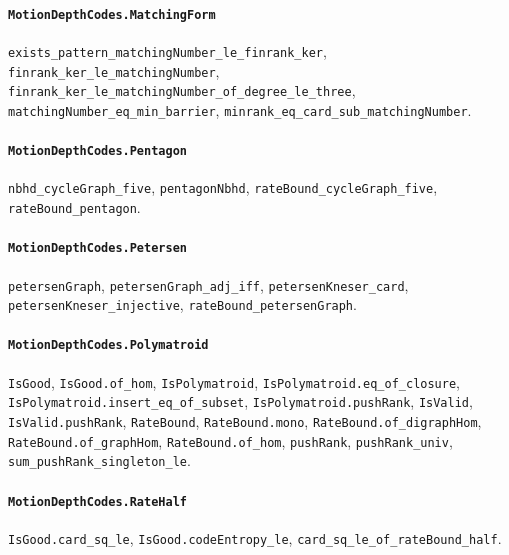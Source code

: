 \paragraph{\texttt{MotionDepthCodes.MatchingForm}}
{\small\raggedright \texttt{exists\_pattern\_matchingNumber\_le\_finrank\_ker}, \texttt{finrank\_ker\_le\_matchingNumber}, \texttt{finrank\_ker\_le\_matchingNumber\_of\_degree\_le\_three}, \texttt{matchingNumber\_eq\_min\_barrier}, \texttt{minrank\_eq\_card\_sub\_matchingNumber}.\par}

\paragraph{\texttt{MotionDepthCodes.Pentagon}}
{\small\raggedright \texttt{nbhd\_cycleGraph\_five}, \texttt{pentagonNbhd}, \texttt{rateBound\_cycleGraph\_five}, \texttt{rateBound\_pentagon}.\par}

\paragraph{\texttt{MotionDepthCodes.Petersen}}
{\small\raggedright \texttt{petersenGraph}, \texttt{petersenGraph\_adj\_iff}, \texttt{petersenKneser\_card}, \texttt{petersenKneser\_injective}, \texttt{rateBound\_petersenGraph}.\par}

\paragraph{\texttt{MotionDepthCodes.Polymatroid}}
{\small\raggedright \texttt{IsGood}, \texttt{IsGood.of\_hom}, \texttt{IsPolymatroid}, \texttt{IsPolymatroid.eq\_of\_closure}, \texttt{IsPolymatroid.insert\_eq\_of\_subset}, \texttt{IsPolymatroid.pushRank}, \texttt{IsValid}, \texttt{IsValid.pushRank}, \texttt{RateBound}, \texttt{RateBound.mono}, \texttt{RateBound.of\_digraphHom}, \texttt{RateBound.of\_graphHom}, \texttt{RateBound.of\_hom}, \texttt{pushRank}, \texttt{pushRank\_univ}, \texttt{sum\_pushRank\_singleton\_le}.\par}

\paragraph{\texttt{MotionDepthCodes.RateHalf}}
{\small\raggedright \texttt{IsGood.card\_sq\_le}, \texttt{IsGood.codeEntropy\_le}, \texttt{card\_sq\_le\_of\_rateBound\_half}.\par}

